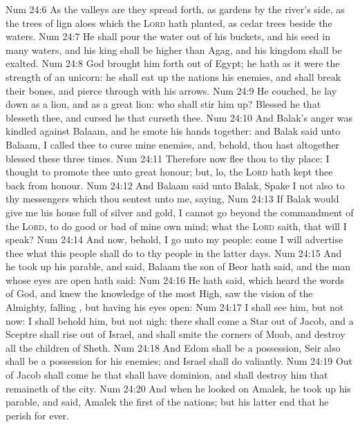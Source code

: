 \vs Num 24:6 As the valleys are they spread forth, as gardens by the river's side, as the trees of lign aloes which the \textsc{Lord} hath planted,  as cedar trees beside the waters.
\vs Num 24:7 He shall pour the water out of his buckets, and his seed  in many waters, and his king shall be higher than Agag, and his kingdom shall be exalted.
\vs Num 24:8 God brought him forth out of Egypt; he hath as it were the strength of an unicorn: he shall eat up the nations his enemies, and shall break their bones, and pierce  through with his arrows.
\vs Num 24:9 He couched, he lay down as a lion, and as a great lion: who shall stir him up? Blessed  he that blesseth thee, and cursed  he that curseth thee.
\vs Num 24:10 And Balak's anger was kindled against Balaam, and he smote his hands together: and Balak said unto Balaam, I called thee to curse mine enemies, and, behold, thou hast altogether blessed  these three times.
\vs Num 24:11 Therefore now flee thou to thy place: I thought to promote thee unto great honour; but, lo, the \textsc{Lord} hath kept thee back from honour.
\vs Num 24:12 And Balaam said unto Balak, Spake I not also to thy messengers which thou sentest unto me, saying,
\vs Num 24:13 If Balak would give me his house full of silver and gold, I cannot go beyond the commandment of the \textsc{Lord}, to do  good or bad of mine own mind;  what the \textsc{Lord} saith, that will I speak?
\vs Num 24:14 And now, behold, I go unto my people: come  I will advertise thee what this people shall do to thy people in the latter days.
\vs Num 24:15 And he took up his parable, and said, Balaam the son of Beor hath said, and the man whose eyes are open hath said:
\vs Num 24:16 He hath said, which heard the words of God, and knew the knowledge of the most High,  saw the vision of the Almighty, falling , but having his eyes open:
\vs Num 24:17 I shall see him, but not now: I shall behold him, but not nigh: there shall come a Star out of Jacob, and a Sceptre shall rise out of Israel, and shall smite the corners of Moab, and destroy all the children of Sheth.
\vs Num 24:18 And Edom shall be a possession, Seir also shall be a possession for his enemies; and Israel shall do valiantly.
\vs Num 24:19 Out of Jacob shall come he that shall have dominion, and shall destroy him that remaineth of the city.
\vs Num 24:20 And when he looked on Amalek, he took up his parable, and said, Amalek  the first of the nations; but his latter end  that he perish for ever.
